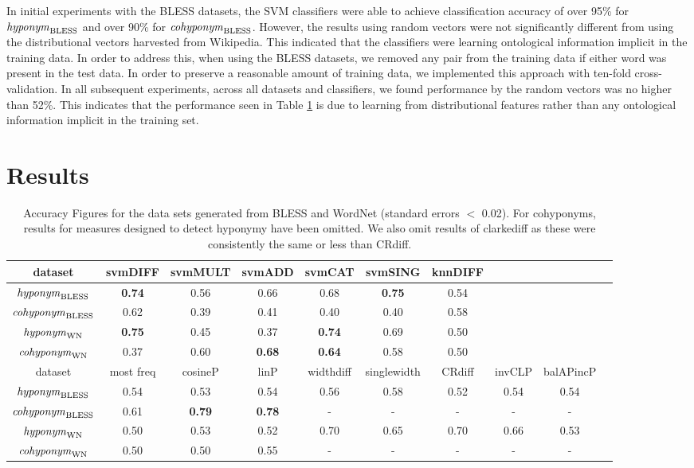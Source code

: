 \documentclass[11pt]{article}
\newcommand\entBLESS{\mbox{\em hyponym\/}_{\mbox{\scriptsize BLESS}}}
\newcommand\coordBLESS{\mbox{\em cohyponym\/}_{\mbox{\scriptsize BLESS}}}
\newcommand\entWN{\mbox{\em hyponym\/}_{\mbox{\scriptsize WN}}}
\newcommand\coordWN{\mbox{\em cohyponym\/}_{\mbox{\scriptsize WN}}}
\begin{document}
In initial experiments with the BLESS datasets, the SVM classifiers were able to achieve classification accuracy of over 95\% for $\entBLESS$ and over 90\% for $\coordBLESS$.  However, the results using random vectors were not significantly different from
using the distributional vectors harvested from Wikipedia.  This indicated that the classifiers were
learning ontological information implicit in the training data. In
order to address this, when using the BLESS datasets, we removed any pair from the training data if
either word was present in the test data. In order to preserve a
reasonable amount of training data, we implemented this approach with
ten-fold cross-validation.   In all subsequent experiments, across all datasets and classifiers, we found performance by the random vectors was no higher than 52\%.  This indicates that the performance seen in Table \ref{table:results_ent} is due to learning from distributional features rather than any ontological information implicit in the training set.

\section{Results}
\label{sect:results}


\begin{table}[ht]
\centering
\begin{tabular}{cccccccccc}
\hline
\small dataset&\small svmDIFF&\small svmMULT&\small svmADD&\small svmCAT&\small svmSING&\small knnDIFF\\
\hline
\small $\entBLESS$&\textbf{0.74}&0.56&0.66&0.68&\textbf{0.75}&0.54\\
\small $\coordBLESS$&0.62&0.39&0.41&0.40&0.40&0.58\\
\small $\entWN$&\textbf{0.75}&0.45&0.37&\textbf{0.74}&0.69&0.50\\
\small $\coordWN$&0.37&0.60&\textbf{0.68}&\textbf{0.64}&0.58&0.50\\
\hline
\small dataset&\small most freq&\small cosineP&\small linP&\small widthdiff&\small singlewidth&\small CRdiff&\small invCLP&\small balAPincP\\
\hline
\small $\entBLESS$&0.54&0.53&0.54&0.56&0.58&0.52&0.54&0.54\\
\small $\coordBLESS$&0.61&\textbf{0.79}&\textbf{0.78}&-&-&-&-&-\\
\small $\entWN$&0.50&0.53&0.52&0.70&0.65&0.70&0.66&0.53\\
\small $\coordWN$&0.50&0.50&0.55&-&-&-&-&-\\
\end{tabular}
\caption{Accuracy Figures for the data sets generated from BLESS and WordNet
  (standard errors $<$ 0.02). For cohyponyms, results for measures
  designed to detect hyponymy have been omitted.  We also omit results of clarkediff as these were consistently the same or less than CRdiff.}
\label{table:results_ent}
\end{table}
\end{document}
